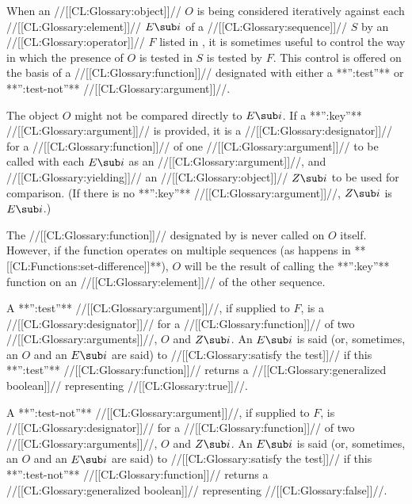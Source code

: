 



When an //[[CL:Glossary:object]]// $O$ is being considered iteratively 
against each //[[CL:Glossary:element]]// $E\sub i$
of a //[[CL:Glossary:sequence]]// $S$
by an //[[CL:Glossary:operator]]// $F$ listed in \thenextfigure,
it is sometimes useful to control the way in which the presence of $O$ 
is tested in $S$ is tested by $F$.
This control is offered on the basis of a //[[CL:Glossary:function]]// designated with 
either a **'':test''** or **'':test-not''** //[[CL:Glossary:argument]]//.



The object $O$ might not be compared directly to $E\sub i$.
If a **'':key''** //[[CL:Glossary:argument]]// is provided,
it is a //[[CL:Glossary:designator]]// for a //[[CL:Glossary:function]]// of one //[[CL:Glossary:argument]]// 
to be called with each $E\sub i$ as an //[[CL:Glossary:argument]]//, 
and //[[CL:Glossary:yielding]]// an //[[CL:Glossary:object]]// $Z\sub i$ to be used for comparison.
(If there is no **'':key''** //[[CL:Glossary:argument]]//, $Z\sub i$ is $E\sub i$.)


The //[[CL:Glossary:function]]// designated by  is never called on $O$ itself.
However, if the function operates on multiple sequences
(\eg as happens in **[[CL:Functions:set-difference]]**), $O$
will be the result of calling the **'':key''** function on an
//[[CL:Glossary:element]]// of the other sequence.  

A **'':test''** //[[CL:Glossary:argument]]//, if supplied to $F$,
is a //[[CL:Glossary:designator]]// for a  //[[CL:Glossary:function]]//
of two //[[CL:Glossary:arguments]]//, $O$ and $Z\sub i$.
An $E\sub i$ is said (or, sometimes, an $O$ and an $E\sub i$ are said)
to //[[CL:Glossary:satisfy the test]]// 
if this **'':test''** //[[CL:Glossary:function]]// returns a //[[CL:Glossary:generalized boolean]]// representing 
//[[CL:Glossary:true]]//.

A **'':test-not''** //[[CL:Glossary:argument]]//, if supplied to $F$, 
is //[[CL:Glossary:designator]]// for a //[[CL:Glossary:function]]// 
of two //[[CL:Glossary:arguments]]//, $O$ and $Z\sub i$.
An $E\sub i$ is said (or, sometimes, an $O$ and an $E\sub i$ are said)
to //[[CL:Glossary:satisfy the test]]// 
if this **'':test-not''** //[[CL:Glossary:function]]//
returns a //[[CL:Glossary:generalized boolean]]// representing //[[CL:Glossary:false]]//.

